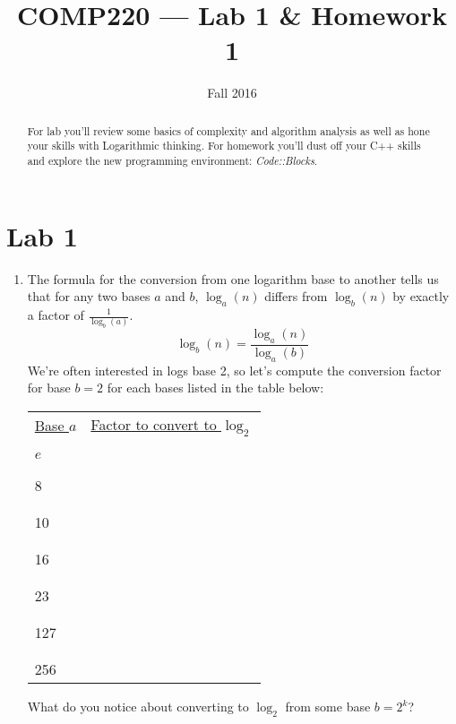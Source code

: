 \documentclass[10pt]{article}
\title{COMP220 --- Lab 1 \& Homework 1}
\author{ }
\date{Fall 2016}
\begin{document}
\maketitle
\thispagestyle{empty}

\begin{abstract}
  For lab you'll review some basics of complexity and algorithm analysis as well as hone your skills with Logarithmic thinking. For homework you'll dust off your C++ skills and explore the new programming environment: \textit{Code::Blocks}.
\end{abstract}

\section{Lab 1}

\begin{enumerate}
  \item The formula for the conversion from one logarithm base to another tells us that for any two bases $a$ and $b$, $\log_a(n)$ differs from $\log_b(n)$ by exactly a factor of $\frac{1}{\log_b(a)}$.
  \[
  \log_b(n) = \dfrac{\log_a(n)}{\log_a(b)}
  \]
  We're often interested in logs base 2, so let's compute the conversion factor for base $b=2$ for each bases listed in the table below:

  \begin{center}
  \begin{tabular}{lc}
  \underline{Base $a$} & \underline{Factor to convert to $\log_2$} \\
     &  \\
     &  \\
  $e$& \underline{\hspace{1.5in}} \\
     &  \\
     &  \\
  8  & \underline{\hspace{1.5in}} \\
     & \\
     &  \\
  10 & \underline{\hspace{1.5in}} \\
     & \\
     &  \\
  16 & \underline{\hspace{1.5in}} \\
     & \\
     &  \\
  23 & \underline{\hspace{1.5in}} \\
     & \\
     &  \\
  127 & \underline{\hspace{1.5in}} \\
   & \\
   &  \\
  256  & \underline{\hspace{1.5in}} \\
  \end{tabular}
  \end{center}
  What do you notice about converting to $\log_2$ from some base $b=2^k$?


\end{enumerate}
\end{document}
